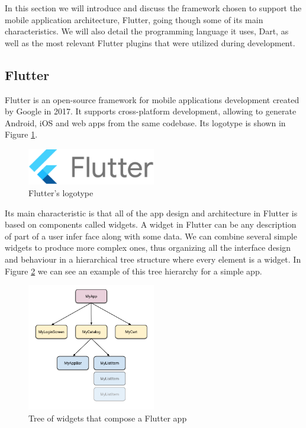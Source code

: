 In this section we will introduce and discuss the framework chosen to support the mobile application architecture, Flutter, going though some of its main characteristics. We will also detail the programming language it uses, Dart, as well as the most relevant Flutter plugins that were utilized during development.

\subsection{Flutter}

Flutter \cite{noauthor_flutter_2021} is an open-source framework for mobile applications development created by Google in 2017. It supports cross-platform development, allowing to generate Android, iOS and web apps from the same codebase. Its logotype is shown in Figure \ref{fig:flutter}.

\begin{figure}[h]
  \centering
  \includegraphics[width=0.5\textwidth]{Figures/flutter.png}
  \caption{%
    Flutter's logotype
  }
  \label{fig:flutter}
\end{figure}

Its main characteristic is that all of the app design and architecture in Flutter is based on components called widgets. A widget in Flutter can be any description of part of a user infer face along with some data. We can combine several simple widgets to produce more complex ones, thus organizing all the interface design and behaviour in a hierarchical tree structure where every element is a widget. In Figure \ref{fig:flutter-widgets} we can see an example of this tree hierarchy for a simple app.

\begin{figure}[h]
  \centering
  \includegraphics[width=0.5\textwidth]{Figures/flutter-widgets.png}
  \caption{%
    Tree of widgets that compose a Flutter app
  }
  \label{fig:flutter-widgets}
\end{figure}

